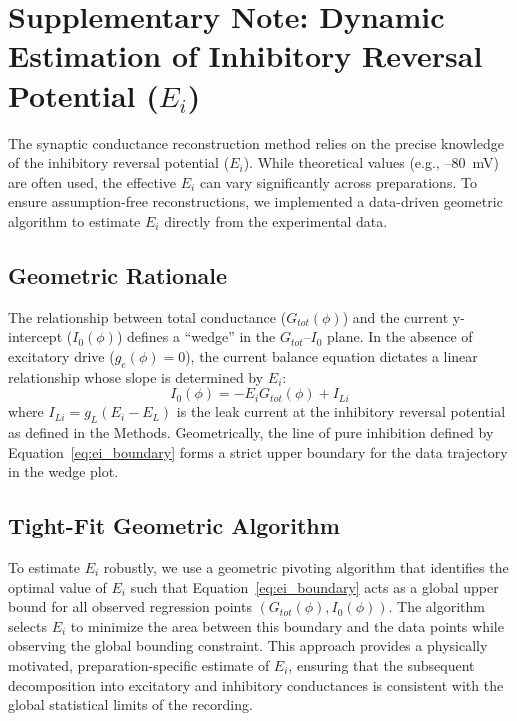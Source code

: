 \section*{Supplementary Note: Dynamic Estimation of Inhibitory Reversal Potential ($E_i$)}

The synaptic conductance reconstruction method relies on the precise knowledge of the inhibitory reversal potential ($E_i$). While theoretical values (e.g., --80~mV) are often used, the effective $E_i$ can vary significantly across preparations. To ensure assumption-free reconstructions, we implemented a data-driven geometric algorithm to estimate $E_i$ directly from the experimental data.

\subsection*{Geometric Rationale}
The relationship between total conductance ($G_{tot}(\phi)$) and the current y-intercept ($I_0(\phi)$) defines a ``wedge'' in the $G_{tot}$--$I_0$ plane. In the absence of excitatory drive ($g_e(\phi) = 0$), the current balance equation dictates a linear relationship whose slope is determined by $E_i$:
\begin{equation} \label{eq:ei_boundary}
    I_0(\phi) = - E_i G_{tot}(\phi) + I_{Li}
\end{equation}
where $I_{Li} = g_L(E_i - E_L)$ is the leak current at the inhibitory reversal potential as defined in the Methods. Geometrically, the line of pure inhibition defined by Equation~\ref{eq:ei_boundary} forms a strict upper boundary for the data trajectory in the wedge plot.

\subsection*{Tight-Fit Geometric Algorithm}
To estimate $E_i$ robustly, we use a geometric pivoting algorithm that identifies the optimal value of $E_i$ such that Equation~\ref{eq:ei_boundary} acts as a global upper bound for all observed regression points $(G_{tot}(\phi), I_{0}(\phi))$. The algorithm selects $E_i$ to minimize the area between this boundary and the data points while observing the global bounding constraint. This approach provides a physically motivated, preparation-specific estimate of $E_i$, ensuring that the subsequent decomposition into excitatory and inhibitory conductances is consistent with the global statistical limits of the recording.

